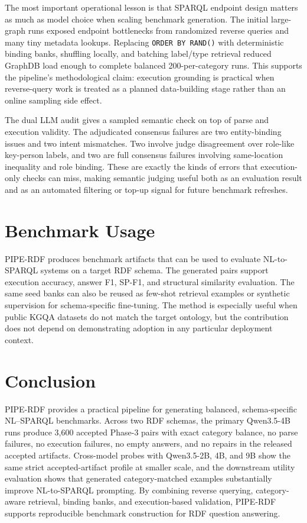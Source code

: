 \documentclass[11pt]{article}
\begin{document}
The most important operational lesson is that SPARQL endpoint design matters as much as model choice when scaling benchmark generation. The initial large-graph runs exposed endpoint bottlenecks from randomized reverse queries and many tiny metadata lookups. Replacing \texttt{ORDER BY RAND()} with deterministic binding banks, shuffling locally, and batching label/type retrieval reduced GraphDB load enough to complete balanced 200-per-category runs. This supports the pipeline's methodological claim: execution grounding is practical when reverse-query work is treated as a planned data-building stage rather than an online sampling side effect.

The dual LLM audit gives a sampled semantic check on top of parse and execution validity. The adjudicated consensus failures are two entity-binding issues and two intent mismatches. Two involve judge disagreement over role-like key-person labels, and two are full consensus failures involving same-location inequality and role binding. These are exactly the kinds of errors that execution-only checks can miss, making semantic judging useful both as an evaluation result and as an automated filtering or top-up signal for future benchmark refreshes.

\section{Benchmark Usage}
\label{sec:benchmark_usage}
PIPE-RDF produces benchmark artifacts that can be used to evaluate NL-to-SPARQL systems on a target RDF schema. The generated pairs support execution accuracy, answer F1, SP-F1, and structural similarity evaluation. The same seed banks can also be reused as few-shot retrieval examples or synthetic supervision for schema-specific fine-tuning. The method is especially useful when public KGQA datasets do not match the target ontology, but the contribution does not depend on demonstrating adoption in any particular deployment context.

\section{Conclusion}
\label{sec:conclusion}
PIPE-RDF provides a practical pipeline for generating balanced, schema-specific NL--SPARQL benchmarks. Across two RDF schemas, the primary Qwen3.5-4B runs produce 3{,}600 accepted Phase-3 pairs with exact category balance, no parse failures, no execution failures, no empty answers, and no repairs in the released accepted artifacts. Cross-model probes with Qwen3.5-2B, 4B, and 9B show the same strict accepted-artifact profile at smaller scale, and the downstream utility evaluation shows that generated category-matched examples substantially improve NL-to-SPARQL prompting. By combining reverse querying, category-aware retrieval, binding banks, and execution-based validation, PIPE-RDF supports reproducible benchmark construction for RDF question answering.
\end{document}
